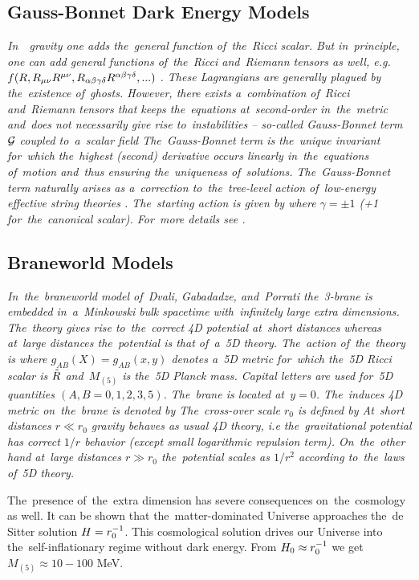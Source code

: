 \subsection{Gauss-Bonnet Dark Energy Models}
{\itshape
In~\fR\ gravity one adds the~general function of~the~Ricci scalar. But in~principle, one can add general functions of~the~Ricci and~Riemann tensors as well, e.g. $f(R,R_{\mu\nu} R^{\mu\nu},R_{\alpha\beta\gamma\delta}R^{\alpha\beta\gamma\delta},...)$ \parencite{2005PhRvD..71f3513C}. These Lagrangians are generally plagued by the~existence of~ghosts.  However, there exists a~combination of~Ricci and~Riemann tensors that keeps the~equations at~second-order in~the~metric and~does not necessarily give rise to~instabilities -- so-called Gauss-Bonnet term $\mathcal{G}$ coupled to~a~scalar field
The~Gauss-Bonnet term is the~unique invariant for~which the~highest (second) derivative occurs linearly in~the~equations of~motion and~thus ensuring the~uniqueness of~solutions. The~Gauss-Bonnet term naturally arises as a~correction to~the~tree-level action of~low-energy effective string theories \parencite{2000PhR...337..343L}. The~starting action is given by
where $\gamma=\pm1$ (+1 for~the~canonical scalar). For~more details see \textcite{2005PhRvD..71l3509N,2006JCAP...06..004N,2013PhRvD..87h4037C}.
} 
\subsection{Braneworld Models}
{\itshape
In~the~braneworld model of~Dvali, Gabadadze, and~Porrati \parencite[DGP model][]{2000PhLB..485..208D} the~3-brane is embedded in~a~Minkowski bulk spacetime with~infinitely large extra dimensions. The~theory gives rise to~the~correct 4D potential at~short distances whereas at~large distances the~potential is that of~a~5D theory. The~action of~the~theory is
where $g_{AB}(X)=g_{AB}(x,y)$ denotes a~5D metric for~which the~5D Ricci scalar is ${\tilde{R}}$ and~$M_{(5)}$ is the~5D Planck mass. Capital letters are used for~5D quantities $(A,B=0,1,2,3,5)$. The~brane is located at~$y=0$. The~induces 4D metric on~the~brane is denoted by
The~cross-over scale $r_0$ is defined by
At~short distances $r\ll r_0$ gravity behaves as usual 4D theory, i.e the~gravitational potential has correct $1/r$ behavior (except small logarithmic repulsion term). On~the~other hand at~large distances $r\gg r_0$ the~potential scales as $1/r^2$ according to~the~laws of~5D theory.

The~presence of~the~extra dimension has severe consequences on~the~cosmology as well. It can be shown \parencite{2010deto.book.....A,2009PhLB..674..237M} that the~matter-dominated Universe approaches the~de Sitter solution $H=r_0^{-1}$. This cosmological solution drives our Universe into the~self-inflationary regime without dark energy. From $H_0\approx r_0^{-1}$ we get $M_{(5)}\approx10-100$ MeV.
} 
